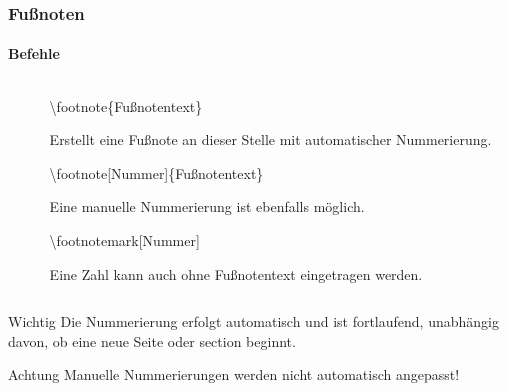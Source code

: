 \begin{frame}
\frametitle{Fu\ss noten}
\framesubtitle{Befehle}
\begin{columns}
\begin{column}{0.5\textwidth}
\begin{ttfamily}\scriptsize

\end{ttfamily}
\end{column}
\begin{column}{0.5\textwidth}
\begin{ttfamily}\color{nounibaredI}\textbackslash footnote\color{black}\{Fu\ss notentext\}\end{ttfamily} Erstellt eine Fußnote an dieser Stelle mit automatischer Nummerierung.

\begin{ttfamily}\color{nounibaredI}\textbackslash footnote\color{nounibagreenI}[Nummer]\color{black}\{Fu\ss notentext\}\end{ttfamily} Eine manuelle Nummerierung ist ebenfalls möglich. 

\begin{ttfamily}\color{nounibaredI}\textbackslash footnotemark\color{nounibagreenI}[Nummer]\color{black}\end{ttfamily}
Eine Zahl kann auch ohne Fußnotentext eingetragen werden.
\end{column}
\end{columns}
\vspace{-.1cm}
\begin{block}{Wichtig}
Die Nummerierung erfolgt automatisch und ist fortlaufend, unabhängig davon, ob
eine neue Seite oder {\ttfamily section} beginnt.
\end{block}
\vspace{-.3cm}
\begin{alertblock}{Achtung}
Manuelle Nummerierungen werden nicht automatisch angepasst!
\end{alertblock}
\vspace{-0.5cm}
\end{frame}


